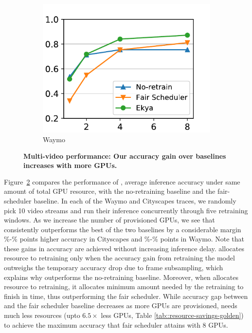 \begin{figure}
\begin{subfigure}[t]{0.5\linewidth}
    \includegraphics[width=\linewidth]{results/multicam/waymo_across_resources.pdf} 
    \caption{\small Waymo}
    \label{fig:scalability-gpus-waymo-golden}
  \end{subfigure}
  \caption{\small \bf Multi-video performance: Our accuracy gain over baselines increases with more GPUs. }
  \label{fig:scalability-gpus}
\end{figure}

Figure~\ref{fig:scalability-gpus} compares the performance of \name, average inference accuracy under same amount of total GPU resource, with the no-retraining baseline and the fair-scheduler baseline.
In each of the Waymo and Cityscapes traces, we randomly pick 10 video streams and run their inference concurrently through five retraining windows.
As we increase the number of provisioned GPUs, we see that \name consistently outperforms the best of the two baselines by a considerable margin
\%-\% points higher accuracy in Cityscapes and \%-\% points in Waymo.
Note that these gains in accuracy are achieved without increasing inference delay.
\name allocates resource to retraining only when the accuracy gain from retraining the model outweighs the temporary accuracy drop due to frame subsampling, which explains why \name outperforms the no-retraining baseline. 
Moreover, when \name allocates resource to retraining, it allocates minimum amount needed by the retraining to finish in time, thus outperforming the fair scheduler.
While accuracy gap between \name{} and the fair scheduler baseline decreases as more GPUs are provisioned, \name needs much less resources (upto $6.5\times$ less GPUs, Table \ref{tab::resource-savings-golden}) to achieve the maximum accuracy that fair scheduler attains with 8 GPUs.

